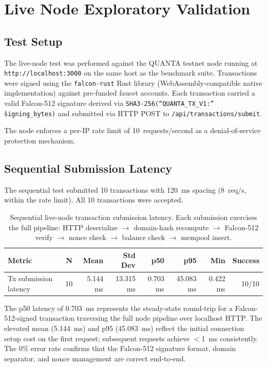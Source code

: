 \documentclass[11pt,a4paper]{article}
\begin{document}
\section{Live Node Exploratory Validation}
\label{sec:livenode}
\subsection{Test Setup}

The live-node test was performed against the QUANTA testnet node running at
\texttt{http://localhost:3000} on the same host as the benchmark suite.
Transactions were signed using the \texttt{falcon-rust} Rust library
(WebAssembly-compatible native implementation) against pre-funded faucet
accounts. Each transaction carried a valid Falcon-512 signature derived via
\texttt{SHA3-256(``QUANTA\_TX\_V1:'' \|\| signing\_bytes)} and submitted via
HTTP POST to \texttt{/api/transactions/submit}.

The node enforces a per-IP rate limit of 10~requests/second as a
denial-of-service protection mechanism.

\subsection{Sequential Submission Latency}

The sequential test submitted 10 transactions with 120~ms spacing
(8~req/s, within the rate limit). All 10 transactions were accepted.

\begin{table}[h]
\centering\small
\begin{tabular}{@{}lrrrrrrr@{}}
\toprule
\textbf{Metric} & \textbf{N} & \textbf{Mean} & \textbf{Std Dev} & \textbf{p50} & \textbf{p95} & \textbf{Min} & \textbf{Success} \\
\midrule
Tx submission latency & 10 & 5.144 ms & 13.315 ms & 0.703 ms & 45.083 ms & 0.422 ms & 10/10 \\
\bottomrule
\end{tabular}
\caption{Sequential live-node transaction submission latency. Each submission
exercises the full pipeline: HTTP deserialize $\to$ domain-hash recompute
$\to$ Falcon-512 verify $\to$ nonce check $\to$ balance check $\to$ mempool
insert.}
\label{tab:liveseq}
\end{table}

The p50 latency of 0.703~ms represents the steady-state round-trip for a
Falcon-512-signed transaction traversing the full node pipeline over localhost
HTTP. The elevated mean (5.144~ms) and p95 (45.083~ms) reflect the initial
connection setup cost on the first request; subsequent requests achieve
$<$1~ms consistently. The 0\% error rate confirms that the Falcon-512
signature format, domain separator, and nonce management are correct
end-to-end.
\end{document}
